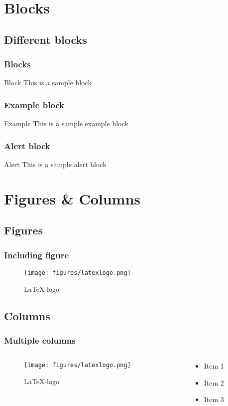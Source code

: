 \documentclass[aspectratio=169]{beamer}
\begin{document}
\section{Blocks}
\subsection{Different blocks}
\begin{frame}
	\frametitle{Blocks}
		\begin{block}{Block}
			This is a sample block
		\end{block}
\end{frame}
\begin{frame}
		\frametitle{Example block}
		\begin{exampleblock}{Example}
			This is a sample example block
		\end{exampleblock}
\end{frame}
\begin{frame}
		\frametitle{Alert block}
		\begin{alertblock}{Alert}
			This is a sample alert block
		\end{alertblock}
\end{frame}	

\section{Figures \& Columns}
\subsection{Figures}
\begin{frame}
	\frametitle{Including figure}
	\begin{figure}
		\centering
		\texttt{[image: figures/latexlogo.png]}
		\caption{\LaTeX-logo}
	\end{figure}
\end{frame}

\subsection{Columns}
\begin{frame}
	\frametitle{Multiple columns}
	\begin{columns}
		\begin{column}{0.5\paperwidth}
		 \begin{figure}
			\centering
			\texttt{[image: figures/latexlogo.png]}
			\caption{\LaTeX-logo}
			\end{figure}
		\end{column}
		\begin{column}{0.5\paperwidth}
		 \begin{itemize}
			\item Item 1
			\item Item 2
			\item Item 3
		 \end{itemize}
		\end{column}	
	\end{columns}
\end{frame}
\end{document}
